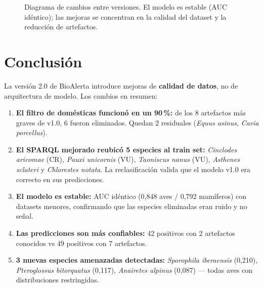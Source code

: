 \documentclass[12pt,a4paper]{article}
\begin{document}
\begin{figure}[H]
{%
}
\caption{Diagrama de cambios entre versiones.  El modelo es estable (AUC idéntico);
         las mejoras se concentran en la calidad del dataset y la reducción de artefactos.}
\label{fig:cambios}
\end{figure}

\section{Conclusión}

La versión 2.0 de BioAlerta introduce mejoras de \textbf{calidad de datos}, no de
arquitectura de modelo.  Los cambios en resumen:

\begin{enumerate}[label=\textbf{\arabic*.}]
  \item \textbf{El filtro de domésticas funcionó en un 90\,\%:}
        de los 8 artefactos más graves de v1.0, 6 fueron eliminados.
        Quedan 2 residuales (\textit{Equus asinus}, \textit{Cavia porcellus}).

  \item \textbf{El SPARQL mejorado reubicó 5 especies al train set:}
        \textit{Cinclodes aricomae} (CR), \textit{Pauxi unicornis} (VU),
        \textit{Taoniscus nanus} (VU), \textit{Asthenes sclateri} y \textit{Chlorestes notata}.
        La reclasificación valida que el modelo v1.0 era correcto en sus predicciones.

  \item \textbf{El modelo es estable:}
        AUC idéntico (0,848 aves / 0,792 mamíferos) con datasets menores,
        confirmando que las especies eliminadas eran ruido y no señal.

  \item \textbf{Las predicciones son más confiables:}
        42 positivos con 2 artefactos conocidos vs 49 positivos con 7 artefactos.

  \item \textbf{3 nuevas especies amenazadas detectadas:}
        \textit{Sporophila iberaensis} (0,210), \textit{Pteroglossus bitorquatus} (0,117),
        \textit{Anairetes alpinus} (0,087) --- todas aves con distribuciones restringidas.
\end{enumerate}
\end{document}
